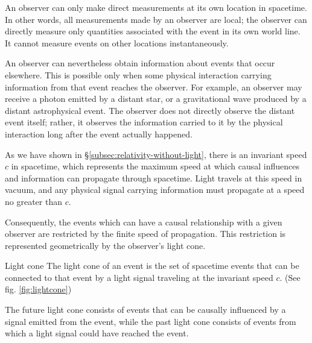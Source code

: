 		An observer can only make direct measurements at its own location in
		spacetime. In other words, all measurements made by an observer are
		local; the observer can directly measure only quantities associated
		with the event in its own world line.
		It cannot measure events on other locations instantaneously. 

		An observer can nevertheless obtain information about events that
		occur elsewhere. This is possible only when some physical
		interaction carrying information from that event reaches the
		observer. For example, an observer may receive a photon emitted by
		a distant star, or a gravitational wave produced by a distant
		astrophysical event. The observer does not directly observe the
		distant event itself; rather, it observes the information carried to
		it by the physical interaction long after the event actually happened.

		As we have shown in \S\ref{subsec:relativity-without-light}, there is an invariant speed $c$ in spacetime,
		which represents the maximum speed at which causal influences and
		information can propagate through spacetime. Light travels at this
		speed in vacuum, and any physical signal carrying information must
		propagate at a speed no greater than $c$.

		Consequently, the events which can have a causal relationship with
		a given observer are restricted by the finite speed of propagation.
		This restriction is represented geometrically by the observer's
		light cone.

		\begin{definition}{Light cone}
			The light cone of an event is the set of spacetime events that
			can be connected to that event by a light signal traveling at
			the invariant speed $c$. (See fig. \ref{fig:lightcone})

			\hspace{1em}The future light cone consists of events that can be causally
			influenced by a signal emitted from the event, while the past
			light cone consists of events from which a light signal could
			have reached the event.
		\end{definition}

